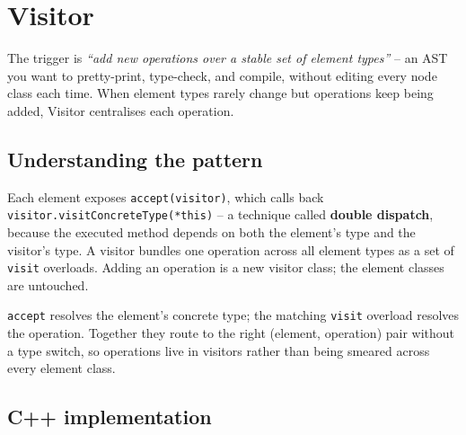 \section{Visitor}
\label{sec:pat-visitor}


\begin{patternbox}
The trigger is \emph{``add new operations over a stable set of element
types''} -- an AST you want to pretty-print, type-check, and compile,
without editing every node class each time. When element types rarely
change but operations keep being added, Visitor centralises each operation.
\end{patternbox}

\subsection*{Understanding the pattern}

Each element exposes \texttt{accept(visitor)}, which calls back
\texttt{visitor.visitConcreteType(*this)} -- a technique called
\textbf{double dispatch}, because the executed method depends on both the
element's type and the visitor's type. A visitor bundles one operation
across all element types as a set of \texttt{visit} overloads. Adding an
operation is a new visitor class; the element classes are untouched.

\begin{ideabox}
\texttt{accept} resolves the element's concrete type; the matching
\texttt{visit} overload resolves the operation. Together they route to the
right (element, operation) pair without a type switch, so operations live
in visitors rather than being smeared across every element class.
\end{ideabox}

\subsection*{C++ implementation}

